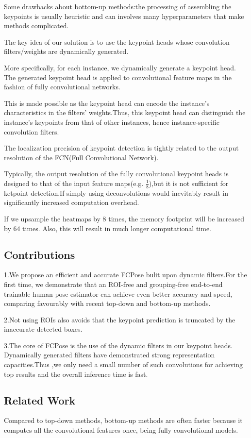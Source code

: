 \documentclass[11pt]{article}
\begin{document}
Some drawbacks about bottom-up methods:the processing of assembling the keypoints is usually heuristic and can involves many hyperparameters that make methods complicated.

The key idea of our solution is to use the keypoint heads whose convolution filters/weights are dynamically generated.

More specifically, for each instance, we dynamically generate a keypoint head. The generated keypoint head is applied to convolutional feature maps in the fashion of fully convolutional networks.

This is made possible as the keypoint head can encode the instance's characteristics in the filters' weights.Thus, this keypoint head can distinguish the instance's keypoints from that of other instances, hence instance-specific convolution filters.

The localization precision of keypoint detection is tightly related to the output resolution of the FCN(Full Convolutional Network).

Typically, the output resolution of the fully convolutional keypoint heads is designed to that of
the input feature maps(e.g. $\frac{1}{8}$),but it is not sufficient for ketpoint detection.If simply using deconvolutions would inevitably result in significantly increased computation overhead.

If we upsample the heatmaps by 8 times, the memory footprint will be increased by 64 times. Also, this will result in much longer computational time.
\subsection{Contributions}
1.We propose an efficient and accurate FCPose bulit upon dynamic filters.For the first time, we demonstrate that an ROI-free and grouping-free end-to-end trainable human pose estimator can achieve even better accuracy and speed, comparing favourably with recent top-down and bottom-up methods.

2.Not using ROIs also avoids that the keypoint prediction is truncated by the inaccurate detected boxes.

3.The core of FCPose is the use of the dynamic filters in our keypoint heads. Dynamically generated filters have demonstrated strong representation capacities.Thus ,we only need a small number of such convolutions for achieving top results and the overall inference time is fast.

\subsection{Related Work}
Compared to top-down methods, bottom-up methods are often faster because it computes all the convolutional features once, being fully convolutional models.
\end{document}
